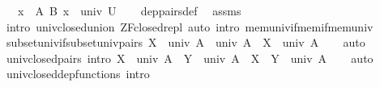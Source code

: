 \begin{isabellebody}
\ \ \ {\isachardoublequoteopen}{\isasymSum}x\ {\isasymin}\ A{\isachardot}{\kern0pt}\ {\isacharparenleft}{\kern0pt}B\ x{\isacharparenright}{\kern0pt}\ {\isasymin}\ univ\ U{\isachardoublequoteclose}\isanewline
%
\isadelimproof
\ \ %
\endisadelimproof
%
\isatagproof
{}\isamarkupfalse%
\ dep{\isacharunderscore}{\kern0pt}pairs{\isacharunderscore}{\kern0pt}def\ \isamarkupfalse%
\ assms\isanewline
\ \ \isamarkupfalse%
\ {\isacharparenleft}{\kern0pt}intro\ univ{\isacharunderscore}{\kern0pt}closed{\isacharunderscore}{\kern0pt}union\ ZF{\isacharunderscore}{\kern0pt}closed{\isacharunderscore}{\kern0pt}repl{\isacharparenright}{\kern0pt}\ {\isacharparenleft}{\kern0pt}auto\ intro{\isacharcolon}{\kern0pt}\ mem{\isacharunderscore}{\kern0pt}univ{\isacharunderscore}{\kern0pt}if{\isacharunderscore}{\kern0pt}mem{\isacharunderscore}{\kern0pt}if{\isacharunderscore}{\kern0pt}mem{\isacharunderscore}{\kern0pt}univ{\isacharparenright}{\kern0pt}%
\endisatagproof
{\isafoldproof}%
%
\isadelimproof
\isanewline
%
\endisadelimproof
\isanewline
{}\isamarkupfalse%
\ subset{\isacharunderscore}{\kern0pt}univ{\isacharunderscore}{\kern0pt}if{\isacharunderscore}{\kern0pt}subset{\isacharunderscore}{\kern0pt}univ{\isacharunderscore}{\kern0pt}pairs{\isacharcolon}{\kern0pt}\ {\isachardoublequoteopen}X\ {\isasymsubseteq}\ univ\ A\ {\isasymtimes}\ univ\ A\ {\isasymLongrightarrow}\ X\ {\isasymsubseteq}\ univ\ A{\isachardoublequoteclose}\isanewline
%
\isadelimproof
\ \ %
\endisadelimproof
%
\isatagproof
{}\isamarkupfalse%
\ auto%
\endisatagproof
{\isafoldproof}%
%
\isadelimproof
\isanewline
%
\endisadelimproof
\isanewline
{}\isamarkupfalse%
\ univ{\isacharunderscore}{\kern0pt}closed{\isacharunderscore}{\kern0pt}pairs\ {\isacharbrackleft}{\kern0pt}intro{\isacharbang}{\kern0pt}{\isacharbrackright}{\kern0pt}{\isacharcolon}{\kern0pt}\ {\isachardoublequoteopen}X\ {\isasymsubseteq}\ univ\ A\ {\isasymLongrightarrow}\ Y\ {\isasymsubseteq}\ univ\ A\ {\isasymLongrightarrow}\ X\ {\isasymtimes}\ Y\ {\isasymsubseteq}\ univ\ A{\isachardoublequoteclose}\isanewline
%
\isadelimproof
\ \ %
\endisadelimproof
%
\isatagproof
{}\isamarkupfalse%
\ auto%
\endisatagproof
{\isafoldproof}%
%
\isadelimproof
\isanewline
%
\endisadelimproof
\isanewline
{}\isamarkupfalse%
\ univ{\isacharunderscore}{\kern0pt}closed{\isacharunderscore}{\kern0pt}dep{\isacharunderscore}{\kern0pt}functions\ {\isacharbrackleft}{\kern0pt}intro{\isacharbang}{\kern0pt}{\isacharbrackright}{\kern0pt}{\isacharcolon}{\kern0pt}\isanewline

\end{isabellebody}

